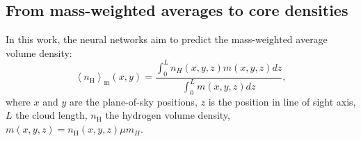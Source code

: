 \documentclass{aa}
\newcommand{\aver}[1]{\ensuremath{\left\langle #1 \right\rangle}}
\newcommand{\nh}{\ensuremath{n_\text{H}}}
\newcommand{\nmh}{\ensuremath{\aver{\nh}_{\text{m}}}}
\begin{document}
\begin{appendix}
\section{From mass-weighted averages to core densities}
   \label{appendix:mw_correction}


   In this work, the neural networks aim to predict the mass-weighted average volume density:
   \begin{equation}
    \label{eq:mw_density_appendix}
      \nmh(x,y)=\frac{\int_{0}^{L}n_H(x,y,z)m(x,y,z)dz}{\int_{0}^{L}m(x,y,z)dz},
   \end{equation}
   where $x$ and $y$ are the plane-of-sky positions, $z$ is the position in line of sight axis, $L$ the cloud length, $\nh$ the hydrogen volume density, $m(x,y,z)=\nh(x,y,z)\mu m_H$. 


\end{appendix}
\end{document}
